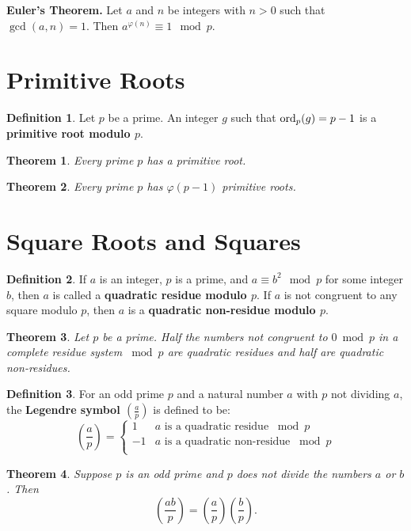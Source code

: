 \documentclass[12pt]{amsart}
\theoremstyle{plain}
\newtheorem{thm}{Theorem}
\theoremstyle{definition}
\newtheorem*{defn}{Definition}
\theoremstyle{remark}
\begin{document}
\noindent\textbf{Euler's Theorem.} Let $a$ and $n$ be integers with $n > 0$ such that $\gcd(a,n) = 1$. Then $a^{\varphi(n)} \equiv 1 \mod p$.

\section{Primitive Roots}
\begin{defn} Let $p$ be a prime.  An integer $g$ such that $\textup{ord}_p(g) = p-1$ is a \textbf{primitive root modulo $p$}.
\end{defn}

\begin{thm}
Every prime $p$ has a primitive root.
\end{thm}

\begin{thm}
Every prime $p$ has $\varphi(p-1)$ primitive roots.
\end{thm}

\section{Square Roots and Squares}

\begin{defn} If $a$ is an integer, $p$ is a prime, and $a \equiv b^2 \mod p$ for some integer $b$, then $a$ is called a \textbf{quadratic residue modulo $p$}.  If $a$ is not congruent to any square modulo $p$, then $a$ is a \textbf{quadratic non-residue modulo $p$}.
\end{defn}

\begin{thm}
Let $p$ be a prime.  Half the numbers not congruent to $0 \bmod p$ in a complete residue system $\bmod p$ are quadratic residues and half are quadratic non-residues.
\end{thm}

\begin{defn} For an odd prime $p$ and a natural number $a$ with $p$ not dividing $a$, the \textbf{Legendre symbol $\left( \frac{a}{p}\right)$} is defined to be:
\[ \left( \frac{a}{p}\right) = \begin{cases} 
      1 & a \text{ is a quadratic residue } \bmod p \\
      -1 & a \text{ is a quadratic non-residue } \bmod p \\
   \end{cases}
\]
\end{defn}

\begin{thm}
Suppose $p$ is an odd prime and $p$ does not divide the numbers $a$ or $b$.  Then $$\left( \frac{ab}{p}\right) = \left( \frac{a}{p}\right)\left( \frac{b}{p}\right).$$
\end{thm}
\end{document}

